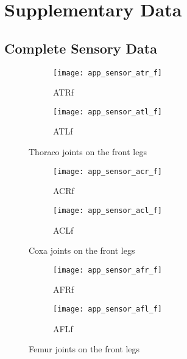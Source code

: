 \chapter{Supplementary Data} \label{app:supp_data}

\section{Complete Sensory Data} \label{app:sec:complete_sensory_data}

\begin{figure}[H]
\centering
\begin{subfigure}{0.48\textwidth}
  \centering
  \texttt{[image: app\_sensor\_atr\_f]}
  \caption{ATRf}
  \label{fig:app_atr_f}
\end{subfigure}
\begin{subfigure}{0.48\textwidth}
  \centering
  \texttt{[image: app\_sensor\_atl\_f]}
  \caption{ATLf}
  \label{fig:app_atl_f}
\end{subfigure}
\caption{Thoraco joints on the front legs}
\label{fig:app_at_f}
\end{figure}

\begin{figure}[H]
\centering
\begin{subfigure}{0.48\textwidth}
  \centering
  \texttt{[image: app\_sensor\_acr\_f]}
  \caption{ACRf}
  \label{fig:app_acr_f}
\end{subfigure}
\begin{subfigure}{0.48\textwidth}
  \centering
  \texttt{[image: app\_sensor\_acl\_f]}
  \caption{ACLf}
  \label{fig:app_acl_f}
\end{subfigure}
\caption{Coxa joints on the front legs}
\label{fig:app_ac_f}
\end{figure}

\begin{figure}[H]
\centering
\begin{subfigure}{0.48\textwidth}
  \centering
  \texttt{[image: app\_sensor\_afr\_f]}
  \caption{AFRf}
  \label{fig:app_afr_f}
\end{subfigure}
\begin{subfigure}{0.48\textwidth}
  \centering
  \texttt{[image: app\_sensor\_afl\_f]}
  \caption{AFLf}
  \label{fig:app_afl_f}
\end{subfigure}
\caption{Femur joints on the front legs}
\label{fig:app_af_f}
\end{figure}


